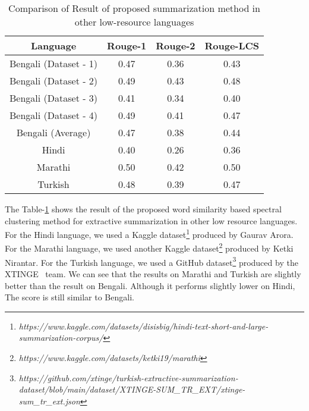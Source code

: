 \begin{table}
    \centering
    \begin{tabular}{cccc}\hline
        Language                & Rouge-1   & Rouge-2   & Rouge-LCS \\\hline
        Bengali (Dataset - 1)   & 0.47      & 0.36      & 0.43      \\
        Bengali (Dataset - 2)   & 0.49      & 0.43      & 0.48      \\
        Bengali (Dataset - 3)   & 0.41      & 0.34      & 0.40      \\
        Bengali (Dataset - 4)   & 0.49      & 0.41      & 0.47      \\
        Bengali (Average)       & 0.47      & 0.38      & 0.44      \\\hline
        Hindi                   & 0.40      & 0.26      & 0.36      \\\hline
        Marathi                 & 0.50	    & 0.42      & 0.50      \\\hline
        Turkish                 & 0.48      & 0.39      & 0.47      \\\hline
    \end{tabular}
    \caption{Comparison of Result of proposed summarization method in other low-resource languages}
    \label{tab:other_language}
\end{table}

The Table-\ref{tab:other_language} shows the result of the proposed word similarity based spectral clustering
method for extractive summarization in other low resource languages.
For the Hindi language, we used a Kaggle
dataset\footnote{\textit{https://www.kaggle.com/datasets/disisbig/hindi-text-short-and-large-summarization-corpus/}}
produced by Gaurav Arora.
For the Marathi language, we used another Kaggle
dataset\footnote{\textit{https://www.kaggle.com/datasets/ketki19/marathi}} produced by Ketki Nirantar.
For the Turkish language, we used a GitHub
dataset\footnote{\textit{https://github.com/xtinge/turkish-extractive-summarization-dataset/blob/main/dataset/XTINGE-SUM\_TR\_EXT/xtinge-sum\_tr\_ext.json}}
produced by the XTINGE~\cite{Demir-2024-xtinge_turkish_extractive} team.
We can see that the results on Marathi and Turkish are slightly better than the result on Bengali.
Although it performs slightly lower on Hindi, The score is still similar to Bengali.


